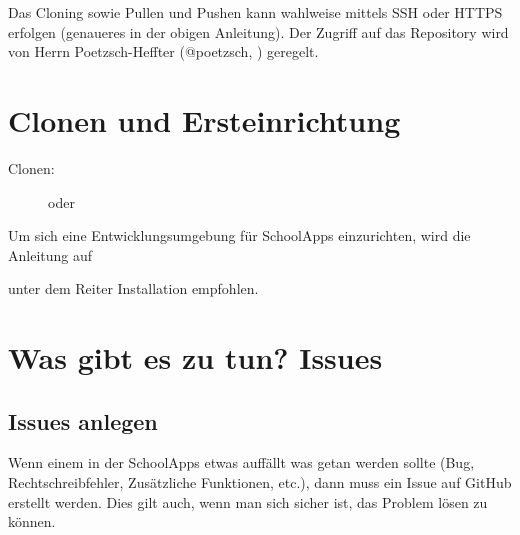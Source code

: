 \documentclass[letterpaper,10pt,ngerman]{sphinxmanual}
\begin{document}
Das Cloning sowie Pullen und Pushen kann wahlweise mittels SSH oder HTTPS erfolgen (genaueres in der obigen Anleitung). Der Zugriff auf das Repository wird von Herrn Poetzsch-Heffter (@poetzsch, ) geregelt.


\section{Clonen und Ersteinrichtung}
\label{\detokenize{dev/git:clonen-und-ersteinrichtung}}\begin{description}
\item[{Clonen:}] \leavevmode
{}

oder 

\end{description}

Um sich eine Entwicklungsumgebung für SchoolApps einzurichten, wird die Anleitung auf
\begin{quote}

\end{quote}

unter dem Reiter Installation empfohlen.


\section{Was gibt es zu tun? \textendash{} Issues}
\label{\detokenize{dev/git:was-gibt-es-zu-tun-issues}}

\subsection{Issues anlegen}
\label{\detokenize{dev/git:issues-anlegen}}
Wenn einem in der SchoolApps etwas auffällt was getan werden sollte (Bug, Rechtschreibfehler, Zusätzliche Funktionen, etc.), dann muss ein Issue auf GitHub erstellt werden. Dies gilt auch, wenn man sich sicher ist, das Problem lösen zu können.
\end{document}
